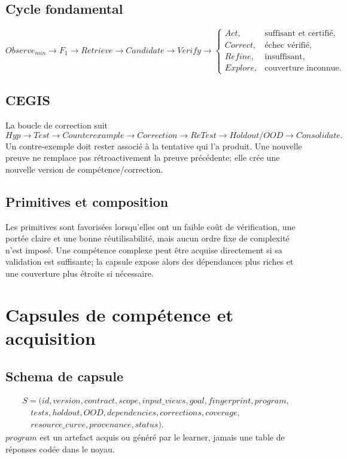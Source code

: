 \documentclass[11pt,a4paper]{report}
\begin{document}
\section{Cycle fondamental}
\[
Observe_{min}\to F_1\to Retrieve\to Candidate\to Verify\to
\begin{cases}
Act,&\text{suffisant et certifié},\\
Correct,&\text{échec vérifié},\\
Refine,&\text{insuffisant},\\
Explore,&\text{couverture inconnue}.
\end{cases}
\]
\section{CEGIS}
La boucle de correction suit
\[
Hyp\to Test\to Counterexample\to Correction\to ReTest\to Holdout/OOD\to Consolidate.
\]
Un contre-exemple doit rester associé à la tentative qui l'a produit. Une nouvelle preuve ne remplace pas rétroactivement la preuve précédente; elle crée une nouvelle version de compétence/correction.

\section{Primitives et composition}
Les primitives sont favorisées lorsqu'elles ont un faible coût de vérification, une portée claire et une bonne réutilisabilité, mais aucun ordre fixe de complexité n'est imposé. Une compétence complexe peut être acquise directement si sa validation est suffisante; la capsule expose alors des dépendances plus riches et une couverture plus étroite si nécessaire.

\chapter{Capsules de compétence et acquisition}
\section{Schema de capsule}
\[
\begin{aligned}
S=(id,version,contract,scope,input\_views,goal,fingerprint,program,\\
\quad tests,holdout,OOD,dependencies,corrections,coverage,\\
\quad resource\_curve,provenance,status).
\end{aligned}
\]
$program$ est un artefact acquis ou généré par le learner, jamais une table de réponses codée dans le noyau.
\end{document}
